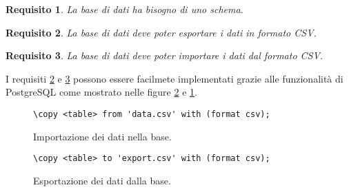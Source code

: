 \documentclass[draft]{article}
\newcommand{\eng}[1]{\foreignlanguage{english}{#1}} %
\newcommand{\file}{\textit{file}}
\newtheorem{requirement}{Requisito}
\begin{document}
\begin{requirement}
La base di dati ha bisogno di uno schema.
\end{requirement}

\begin{requirement}\label{thm:export}
La base di dati deve poter esportare i dati in formato CSV.
\end{requirement}

\begin{requirement}\label{thm:import}
La base di dati deve poter importare i dati dal formato CSV.
\end{requirement}

I requisiti \ref{thm:export} e \ref{thm:import} possono essere facilmete
implementati grazie alle funzionalità di PostgreSQL come mostrato nelle figure
\ref{fig:export} e \ref{fig:import}.

\begin{figure}
\centering\verb+\copy <table> from 'data.csv' with (format csv);+
\caption{Importazione dei dati nella base.}
\label{fig:import}
\end{figure}

\begin{figure}
\centering\verb+\copy <table> to 'export.csv' with (format csv);+
\caption{Esportazione dei dati dalla base.}
\label{fig:export}
\end{figure}




\iffalse %
I dati saranno quindi presi in \eng{input} da tre \file\ CSV: uno per i dati
geografici, uno per quelli meteorologici e uno per lo stato iniziale
dell'incendio. Ognuno di questi file sarà corredato da un'altro CSV che ne
conterrà le informazioni sulla ``grana''.

Per permettere l'aggiornamento di questi dati durante la simulazione il
simulatore monitorerà la presenza di \file\ con nomi come \texttt{land.csv},
\texttt{meteo.csv} e \texttt{fire.csv}. Nel caso in cui uno di questi file sia
presente, dopo l'inizio della simulazione il simulatore provvederà a leggerli,
aggiornare il suo stato interno e cambiargli nome\footnote{con nomi tipo
\texttt{land\_<timestamp>.csv}} (o eliminarli) per evitare di rileggerli in
futuro.

Un implementazione ingenua della scrittura di questi file per l'aggiornamento
dei dati potrebbe generare una \eng{race-condition}, ovvero la lettura di
incompletidati, dato che la scrittura in un file non è atomica. Per evirate ciò
una strateggia potrebbe essere quella di scrivere i dati in file con nomi tipo
\texttt{tmpXXX} e una volta finito di scriverli si può usare \texttt{rename(2)},
che è atomica, per dargli il nome giusto. Questo metodo sarà anche usata per la
scrittura dei file.
\fi
\end{document}
